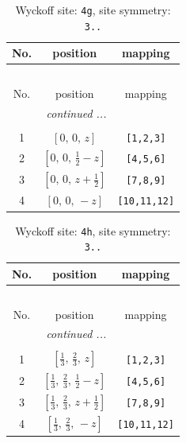 \documentclass[fleqn,8pt]{jsarticle}
\begin{document}
\begin{longtable}{ccc}
\caption{Wyckoff site: {\tt 4g}, site symmetry: {\tt 3..}}
 \\
 \hline \hline
No. & position & mapping \\ \hline \endfirsthead

\multicolumn{2}{l}{\tablename\ \thetable{}} \\
 \hline \hline
No. & position & mapping \\ \hline \endhead

 \hline \hline
\multicolumn{2}{r}{\footnotesize\it continued ...} \\ \endfoot

 \hline \hline
\multicolumn{2}{r}{} \\ \endlastfoot

1 & $\left[ 0,\, 0,\, z \right]$ & {\tt [1,2,3]} \\ \hline
2 & $\left[ 0,\, 0,\, \frac{1}{2} - z \right]$ & {\tt [4,5,6]} \\ \hline
3 & $\left[ 0,\, 0,\, z + \frac{1}{2} \right]$ & {\tt [7,8,9]} \\ \hline
4 & $\left[ 0,\, 0,\, - z \right]$ & {\tt [10,11,12]} \\
\end{longtable}
\renewcommand{\arraystretch}{1.2}
\begin{longtable}{ccc}
\caption{Wyckoff site: {\tt 4h}, site symmetry: {\tt 3..}}
 \\
 \hline \hline
No. & position & mapping \\ \hline \endfirsthead

\multicolumn{2}{l}{\tablename\ \thetable{}} \\
 \hline \hline
No. & position & mapping \\ \hline \endhead

 \hline \hline
\multicolumn{2}{r}{\footnotesize\it continued ...} \\ \endfoot

 \hline \hline
\multicolumn{2}{r}{} \\ \endlastfoot

1 & $\left[ \frac{1}{3},\, \frac{2}{3},\, z \right]$ & {\tt [1,2,3]} \\ \hline
2 & $\left[ \frac{1}{3},\, \frac{2}{3},\, \frac{1}{2} - z \right]$ & {\tt [4,5,6]} \\ \hline
3 & $\left[ \frac{1}{3},\, \frac{2}{3},\, z + \frac{1}{2} \right]$ & {\tt [7,8,9]} \\ \hline
4 & $\left[ \frac{1}{3},\, \frac{2}{3},\, - z \right]$ & {\tt [10,11,12]} \\
\end{longtable}
\end{document}
